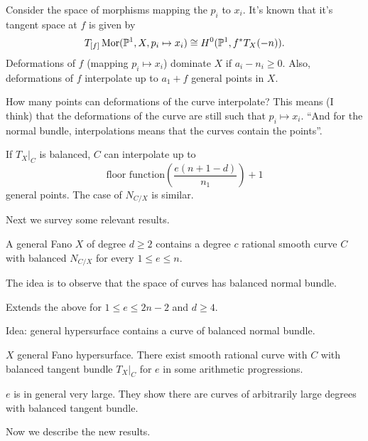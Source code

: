Consider the space of morphisms mapping
the  $p_i$ to $x_i$. It's known that it's tangent space
at $f$
is given by
$$
T_{[f]}\mathop{\mathrm{Mor}}\nolimits(\mathbb{P}^1,X,p_i \mapsto x_i)
\cong H^0(\mathbb{P}^1,f^*T_X(-n)).
$$
\noindent
Deformations of $f$ (mapping $p_i \mapsto x_i$)
dominate $X$ if $a_i-n_i \geq 0$.
Also, deformations of $f$ interpolate up
to $a_1+f$ general points in $X$.

\medskip\noindent
How many points can deformations of the curve interpolate?
This means (I think) that the deformations of the curve
are still such that $p_i \mapsto  x_i$.
``And for the normal bundle, interpolations
means that the curves contain the points''.

If $T_X|_{C}$ is balanced, $C$ can interpolate up to
$$
\text{floor function}(\frac{e(n+1-d)}{n_1}) +1
$$
general points. The case of $N_{C/X}$ is similar.

\medskip\noindent
Next we survey some relevant results.

\begin{theorem}
\label{theorem-CR18}
A general Fano $X$ of degree $d \geq 2$ 
contains a degree $c$ rational smooth curve
 $C$ with balanced $N_{C/X}$ 
for every $1 \leq e \leq  n$.
\end{theorem}

The idea is to observe that the space of curves has
balanced normal bundle.

\begin{theorem}[Ran, 2021]
\label{theorem-R21}
Extends the above for
$1 \leq  e \leq 2n-2$ 
and $d \geq 4$.
\end{theorem}

Idea: general hypersurface contains a curve of balanced normal bundle.

\begin{theorem}[Ran, 2024]
\label{theorem-R24}
$X$ general Fano hypersurface.
There exist smooth rational curve with  $C$ 
with balanced tangent bundle $T_{X}|_{C}$ 
for $e$ in some arithmetic progressions.
\end{theorem}

$e$ is in general very large.
They show there are curves of arbitrarily large
degrees with balanced tangent bundle.

\medskip\noindent
Now we describe the new results.

